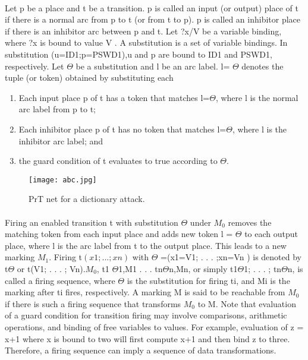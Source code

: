 \paragraph{}
Let p be a place and t be a transition. p is called an input (or output) place of t if there is a normal arc from p to t (or from t to p). p is called an inhibitor place if there is an inhibitor arc between p and t. Let ?x/V be a variable
binding, where ?x is bound to value V . A substitution is a
set of variable bindings. In substitution (u=ID1;p=PSWD1),u and p are bound to ID1 and PSWD1,
respectively. Let $\Theta$ be a substitution and l be an arc label. l= $\Theta$
denotes the tuple (or token) obtained by substituting each
\begin{enumerate}
\item Each input place p of t has a token that
matches l=$\Theta$, where l is the normal arc label from p to t;
\item Each inhibitor place p of t has no token that matches l=$\Theta$,
where l is the inhibitor arc label; and
\item the guard condition of t evaluates to true according to $\Theta$.
\end{enumerate}
\begin{figure}
\centering
\texttt{[image: abc.jpg]}
\caption{PrT net for a dictionary attack.}
\label{fig:1}
\end{figure}
\paragraph{}Firing an enabled transition t with substitution $\Theta$ under $M_0$  removes the matching token from each input place and adds new token l = $\Theta$ to each output place, where l is the arc label from t to the output place. This leads to a new marking $M_1$. Firing t$(x1; . . . ; xn)$ with $\Theta $ =(x1=V1; . . . ;xn=Vn ) is denoted by t$\Theta$ or t(V1; . . . ; Vn).$M_0$, t1 $\Theta$1,M1 . . . tn$\Theta$n,Mn, or simply t1$\Theta$1; . . . ; tn$\Theta$n, is called a firing sequence, where $\Theta$ is the substitution for firing ti, and Mi is the marking after ti fires, respectively. A marking M is said to be reachable from $M_0$ if there is such a firing sequence that transforms $M_0$ to M. Note that evaluation of a guard condition for transition firing may involve comparisons, arithmetic operations, and binding of free variables to values. For example, evaluation of z = x+1 where x is bound to two will first compute
x+1 and then bind z to three. Therefore, a firing sequence
can imply a sequence of data transformations.
